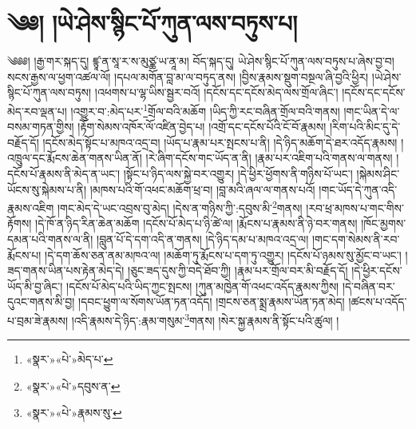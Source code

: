 \chapter{༄༅། །ཡེ་ཤེས་སྙིང་པོ་ཀུན་ལས་བཏུས་པ།}༄༅༅། །རྒྱ་གར་སྐད་དུ། ཛྙཱ་ན་སཱ་ར་ས་མུཙྪ་ཡ་ནཱ་མ། བོད་སྐད་དུ། ཡེ་ཤེས་སྙིང་པོ་ཀུན་ལས་བཏུས་པ་ཞེས་བྱ་བ། སངས་རྒྱས་ལ་ཕྱག་འཚལ་ལོ། །དཔལ་མགོན་བླ་མ་ལ་བཏུད་ནས། །བྱིས་རྣམས་སྡུག་བསྔལ་ཞི་བྱའི་ཕྱིར། །ཡེ་ཤེས་སྙིང་པོ་ཀུན་ལས་བཏུས། །འཕགས་པ་ལྷ་ཡིས་སྦྱར་བའོ། །དངོས་དང་དངོས་མེད་ལས་གྲོལ་ཞིང་། །དངོས་དང་དངོས་མེད་རབ་ལྡན་པ། །འགྱུར་བ་:མེད་པར་\footnote{«སྣར་»«པེ་»མེད་པ་}གྲོལ་བའི་མཆོག །ཡིད་ཀྱི་རང་བཞིན་གྲོལ་བའི་གནས། །གང་ཡིན་དེ་ལ་བསམ་གཏན་གྱིས། །རྟོག་སེམས་འཁོར་ལོ་འཛིན་བྱེད་པ། །འགྲོ་དང་དངོས་པོའི་ངོ་བོ་རྣམས། །རིག་པའི་མིང་དུ་དེ་བརྗོད་དོ། །དངོས་མེད་སྟོང་པ་མཁའ་འདྲ་བ། །ཡོད་པ་རྣམ་པར་སྤངས་པ་ནི། །དེ་ཉིད་མཆོག་དེ་ཐར་འདོད་རྣམས། །འཁྲུལ་དང་རྨོངས་ཆེན་གནས་ཡིན་ནོ། །རེ་ཞིག་དངོས་གང་ཡོད་ན་ནི། །རྣམ་པར་འཇིག་པའི་གནས་ལ་གནས། །དངོས་པོ་རྣམས་ནི་མེད་ན་ཡང་། །སྟོང་པ་ཉིད་ལས་སྐྱེ་བར་འགྱུར། །དེ་ཕྱིར་ཕྱོགས་ནི་གཉིས་པོ་ཡང་། །སྐེམས་ཤིང་ཡོངས་སུ་སྐེམས་པ་ནི། །མཁས་པའི་གོ་འཕང་མཆོག་ཕྲ་བ། །བླ་མའི་ཞལ་ལ་གནས་པའོ། །གང་ཡོད་དེ་ཀུན་འདི་རྣམས་འཇིག །གང་མེད་དེ་ཡང་འབྲས་བུ་མེད། །དེས་ན་གཉིས་ཀྱི་:དབུས་མི་\footnote{«སྣར་»«པེ་»དབུས་ན་}གནས། །རབ་ཕྲ་མཁས་པ་གང་གིས་རྟོགས། །དེ་ཁོ་ན་ཉིད་རིན་ཆེན་མཆོག །དངོས་པོ་མེད་པ་ཉི་ཚེ་ལ། །རྨོངས་པ་རྣམས་ནི་ཉེ་བར་གནས། །ཁོང་མྱགས་དམན་པའི་གནས་ལ་ནི། །བླུན་པོ་དེ་དག་འདི་ན་གནས། །དེ་ཉིད་དམ་པ་མཁའ་འདྲ་ལ། །གང་དག་སེམས་ནི་རབ་རྨོངས་པ། །དེ་དག་ཆོས་ཅན་ནམ་མཁའ་ལ། །མཆོག་ཏུ་རྨོངས་པ་དག་ཏུ་འགྱུར། །དངོས་པོ་ཉམས་སུ་མྱོང་བ་ཡང་། །ཟད་གནས་ཡིན་པས་རྟེན་མེད་དེ། །ཅུང་ཟད་དུས་ཀྱི་བདེ་ཐོབ་ཀྱི། །རྣམ་པར་གྲོལ་བར་མི་བརྗོད་དོ། །དེ་ཕྱིར་དངོས་ཡོད་མི་བྱ་ཞིང་། །དངོས་པོ་མེད་པའི་ཡིད་ཀྱང་སྤངས། །ཀུན་མཁྱེན་གོ་འཕང་འདོད་རྣམས་ཀྱིས། །དེ་བཞིན་བར་དུའང་གནས་མི་བྱ། །དབང་ཕྱུག་ལ་སོགས་ཡོན་ཏན་འདོད། །གྲངས་ཅན་སྨྲ་རྣམས་ཡོན་ཏན་མེད། །ཚངས་པ་འདོད་པ་བྲམ་ཟེ་རྣམས། །འདི་རྣམས་དེ་ཉིད་:རྣམ་གསུམ་\footnote{«སྣར་»«པེ་»རྣམས་སུ་}གནས། །སེར་སྐྱ་རྣམས་ནི་སྟོང་པའི་ཚུལ། །
